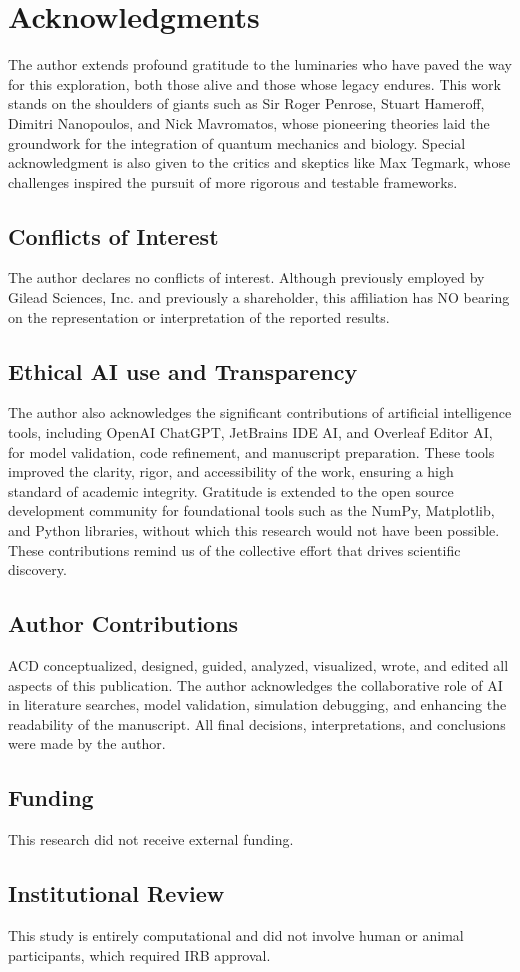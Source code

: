 \section{Acknowledgments} 
The author extends profound gratitude to the luminaries who have paved the way for this exploration, both those alive and those whose legacy endures. This work stands on the shoulders of giants such as Sir Roger Penrose, Stuart Hameroff, Dimitri Nanopoulos, and  Nick Mavromatos, whose pioneering theories laid the groundwork for the integration of  quantum mechanics and biology. Special acknowledgment is also given to the critics and skeptics like Max Tegmark, whose challenges inspired the pursuit of more rigorous and testable frameworks. 
\subsection{Conflicts of Interest} 
The author declares no conflicts of interest. Although previously employed by Gilead Sciences, Inc. and previously a shareholder, this affiliation has NO bearing on the representation or interpretation of the reported results.  
\subsection{Ethical AI use and Transparency} 
The author also acknowledges the significant contributions of artificial intelligence tools,  including OpenAI ChatGPT, JetBrains IDE AI, and Overleaf Editor AI, for model validation,  code refinement, and manuscript preparation. These tools improved the clarity, rigor, and accessibility of the work, ensuring a high standard of academic integrity. 
Gratitude is extended to the open source development community for foundational tools such as the NumPy, Matplotlib, and Python libraries, without which this research would not have been possible. 
These contributions remind us of the collective effort that drives
scientific discovery. 
\subsection{Author Contributions} 
ACD conceptualized, designed, guided, analyzed, visualized, wrote, and edited all aspects of this publication. The author acknowledges the collaborative role of AI in literature searches, model validation, simulation debugging, and enhancing the readability of the manuscript. All final decisions, interpretations, and conclusions were made by the author. 
\subsection{Funding} 
This research did not receive external funding. 
\subsection{Institutional Review} 
This study is entirely computational and did not involve human or animal participants,  which required IRB approval. 



